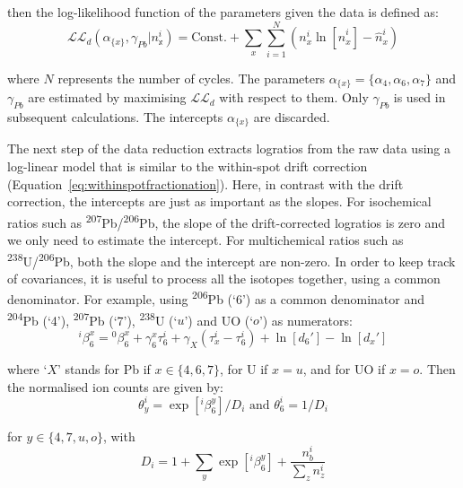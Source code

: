 \documentclass{article}
\begin{document}
\noindent then the log-likelihood function of the parameters given the
data is defined as:
\begin{equation}
  \mathcal{LL}_{d}\left(\alpha_{\{x\}},\gamma_{Pb}|n_{\mathbb{x}}^i\right) =
  \mbox{Const.} + \underset{x}{\sum} \sum\limits_{i=1}^{N}
  \left( n_x^i \ln\!\left[\hat{n}_x^i\right] - \hat{n}_x^i \right)
\end{equation}

\noindent where $N$ represents the number of cycles. The parameters
$\alpha_{\{x\}}=\{\alpha_4,\alpha_6,\alpha_7\}$ and $\gamma_{Pb}$ are
estimated by maximising $\mathcal{LL}_d$ with respect to them. Only
$\gamma_{Pb}$ is used in subsequent calculations.  The intercepts
$\alpha_{\{x\}}$ are discarded.\medskip

The next step of the data reduction extracts logratios from the raw
data using a log-linear model that is similar to the within-spot drift
correction (Equation~\ref{eq:withinspotfractionation}). Here, in
contrast with the drift correction, the intercepts are just as
important as the slopes. For isochemical ratios such as
\textsuperscript{207}Pb/\textsuperscript{206}Pb, the slope of the
drift-corrected logratios is zero and we only need to estimate the
intercept. For multichemical ratios such as
\textsuperscript{238}U/\textsuperscript{206}Pb, both the slope and the
intercept are non-zero. In order to keep track of covariances, it is
useful to process all the isotopes together, using a common
denominator. For example, using \textsuperscript{206}Pb (`6') as a
common denominator and \textsuperscript{204}Pb (`4'),
\textsuperscript{207}Pb (`7'), \textsuperscript{238}U (`$u$') and UO
(`$o$') as numerators:
\begin{equation}
  {}^{i}\!{\beta}^{x}_{6} =
  {}^{0}\!\beta_{6}^{x} + \gamma_{6}^{x} \tau_{6}^i +
  \gamma_{X} \left(\tau_{x}^i-\tau_{6}^i\right) + \ln[d_{6}'] - \ln[d_{x}']
\end{equation}

\noindent where `$X$' stands for Pb if $x\in\{4,6,7\}$, for U if
$x=u$, and for UO if $x=o$. Then the normalised ion counts are given
by:
\begin{equation}
  {\theta}^{i}_{y} = \exp\!\left[{}^{i}\!{\beta}_{6}^{y}\!\right]/D_i
  \mbox{~and~}
  {\theta}^{i}_{6} = 1/D_i
\end{equation}

\noindent for $y\in\{4,7,u,o\}$, with
\begin{equation}
  D_i = 1 + \underset{y}{\sum}
  \exp[{}^{i}\!{\beta}^y_6] + \frac{n^i_b}{\underset{z}{\sum}n^i_z}
\end{equation}
\end{document}
